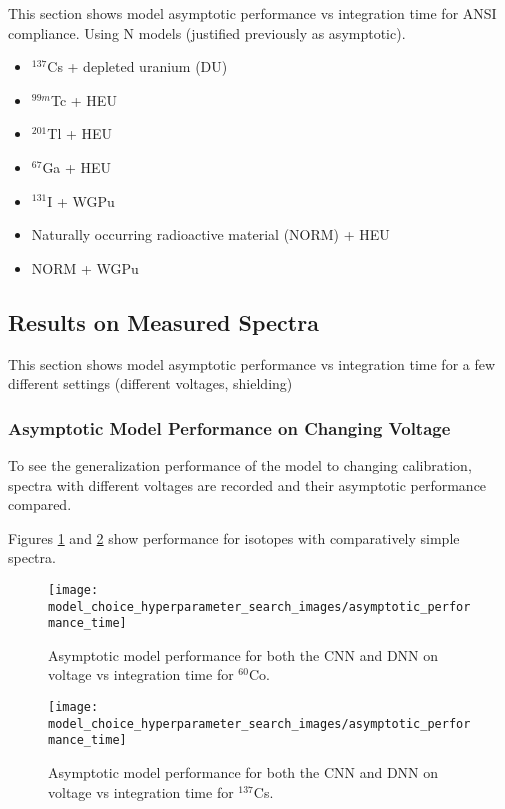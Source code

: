 This section shows model asymptotic performance vs integration time for ANSI compliance. Using N models (justified previously as asymptotic). 


\begin{itemize}
  \item $^{137}$Cs + depleted uranium (DU)
  \item $^{99m}$Tc + HEU
  \item $^{201}$Tl + HEU
  \item $^{67}$Ga + HEU
  \item $^{131}$I + WGPu
  \item Naturally occurring radioactive material (NORM) + HEU
  \item NORM + WGPu
\end{itemize}


\subsection{Results on Measured Spectra}

This section shows model asymptotic performance vs integration time for a few different settings (different voltages, shielding)

\subsubsection{Asymptotic Model Performance on Changing Voltage}

To see the generalization performance of the model to changing calibration, spectra with different voltages are recorded and their asymptotic performance compared.

Figures \ref{fig:model_asymptotic_performance_co60} and \ref{fig:model_asymptotic_performance_cs137} show performance for isotopes with comparatively simple spectra.

\begin{figure}[H]
	\centering
	\texttt{[image: model\_choice\_hyperparameter\_search\_images/asymptotic\_performance\_time]}
	\caption{Asymptotic model performance for both the CNN and DNN on voltage vs integration time for $^{60}$Co.}
	\label{fig:model_asymptotic_performance_co60}
\end{figure}

\begin{figure}[H]
	\centering
	\texttt{[image: model\_choice\_hyperparameter\_search\_images/asymptotic\_performance\_time]}
	\caption{Asymptotic model performance for both the CNN and DNN on voltage vs integration time for $^{137}$Cs.}
	\label{fig:model_asymptotic_performance_cs137}
\end{figure}

